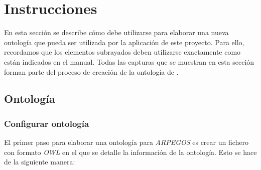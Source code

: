 
\section{Instrucciones}
En esta sección se describe cómo debe utilizarse \protege para elaborar una nueva ontología que pueda ser utilizada 
por la aplicación de este proyecto. Para ello, recordamos que los elementos subrayados deben utilizarse exactamente 
como están indicados en el manual. Todas las capturas que se muestran en esta sección forman parte del proceso de 
creación de la ontología de \anima. 

\subsection{Ontología}
\subsubsection{Configurar ontología}
El primer paso para elaborar una ontología para \textit{ARPEGOS} es crear un fichero con formato \textit{OWL} en el que 
se detalle la información de la ontología. Esto se hace de la siguiente manera: 

